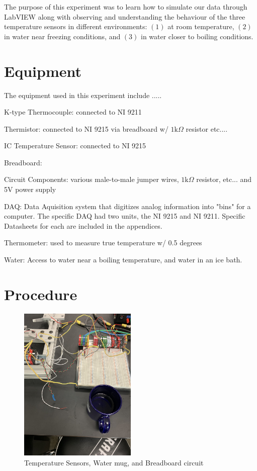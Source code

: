 \documentclass{article}
\begin{document}
The purpose of this experiment was to learn how to simulate our data through LabVIEW along with observing and understanding the behaviour of the three temperature sensors in different environments: $(1)$ at room temperature, $(2)$ in water near freezing conditions, and $(3)$ in water closer to boiling conditions. 

\section{Equipment}
The equipment used in this experiment include .....

K-type Thermocouple:  connected to NI 9211

Thermistor:  connected to NI 9215 via breadboard w/ $1\text{k}\Omega$ resistor etc....

IC Temperature Sensor: connected to NI 9215

Breadboard: 

Circuit Components:  various male-to-male jumper wires, $1\text{k}\Omega$ resistor, etc... and 5V power supply

DAQ:  Data Aquisition system that digitizes analog information into "bins" for a computer.  The specific DAQ had two units, the NI 9215 and NI 9211.  Specific Datasheets for each are included in the appendices.  

Thermometer:  used to measure true temperature w/ 0.5 degrees 

Water:  Access to water near a boiling temperature, and water in an ice bath.   




\section{Procedure}
\begin{figure}[H]
\centering
\includegraphics[width=0.5\textwidth, angle = -90]{Lab 2/lab2images/circuit_board_mug_and_sensors.jpg}
\caption{Temperature Sensors, Water mug, and Breadboard circuit}
\end{figure}
\end{document}
